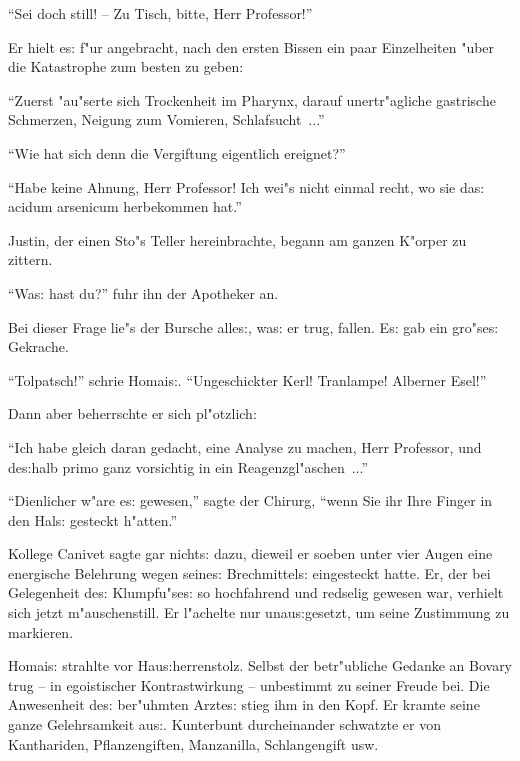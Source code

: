 \documentclass[oneside,12pt]{book}
\newenvironment{antiqua}{\normalfont}{}%
\newcommand{\s}{s:}%
\begin{document}
"`Sei doch still! -- Zu Tisch, bitte, Herr Professor!"'

Er hielt e{\s} f"ur angebracht, nach den ersten Bissen ein paar
Einzelheiten "uber die Katastrophe zum besten zu geben:

"`Zuerst "au"serte sich Trockenheit im Pharynx, darauf
unertr"agliche gastrische Schmerzen, Neigung zum Vomieren,
Schlafsucht~..."'

"`Wie hat sich denn die Vergiftung eigentlich ereignet?"'

"`Habe keine Ahnung, Herr Professor! Ich wei"s nicht einmal recht,
wo sie da{\s} \begin{antiqua}acidum arsenicum\end{antiqua}
herbekommen hat."'

Justin, der einen Sto"s Teller hereinbrachte, begann am ganzen
K"orper zu zittern.

"`Wa{\s} hast du?"' fuhr ihn der Apotheker an.

Bei dieser Frage lie"s der Bursche alle{\s}, wa{\s} er trug,
fallen. E{\s} gab ein gro"se{\s} Gekrache.

"`Tolpatsch!"' schrie Homai{\s}. "`Ungeschickter Kerl! Tranlampe!
Alberner Esel!"'

Dann aber beherrschte er sich pl"otzlich:

"`Ich habe gleich daran gedacht, eine Analyse zu machen, Herr
Professor, und de{\s}halb \begin{antiqua}primo\end{antiqua} ganz
vorsichtig in ein Reagenzgl"aschen~..."'

"`Dienlicher w"are e{\s} gewesen,"' sagte der Chirurg, "`wenn Sie
ihr Ihre Finger in den Hal{\s} gesteckt h"atten."'

Kollege Canivet sagte gar nicht{\s} dazu, dieweil er soeben unter
vier Augen eine energische Belehrung wegen seine{\s}
Brechmittel{\s} eingesteckt hatte. Er, der bei Gelegenheit de{\s}
Klumpfu"se{\s} so hochfahrend und redselig gewesen war, verhielt
sich jetzt m"auschenstill. Er l"achelte nur unau{\s}gesetzt, um
seine Zustimmung zu markieren.

Homai{\s} strahlte vor Hau{\s}herrenstolz. Selbst der betr"ubliche
Gedanke an Bovary trug -- in egoistischer Kontrastwirkung --
unbestimmt zu seiner Freude bei. Die Anwesenheit de{\s} ber"uhmten
Arzte{\s} stieg ihm in den Kopf. Er kramte seine ganze
Gelehrsamkeit au{\s}. Kunterbunt durcheinander schwatzte er von
Kanthariden, Pflanzengiften, Manzanilla, Schlangengift usw.
\end{document}
